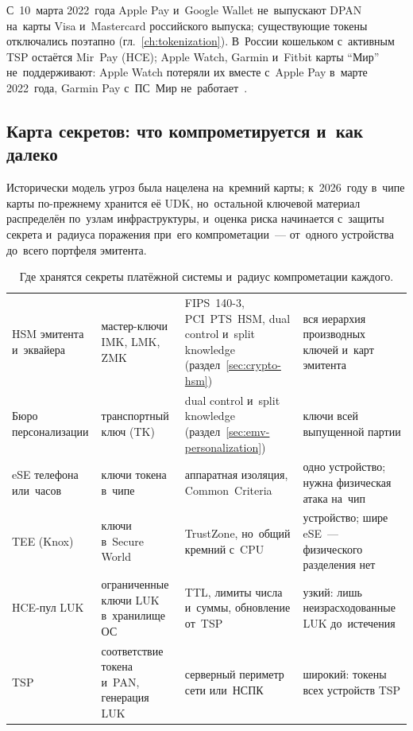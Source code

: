 С~10~марта 2022~года Apple Pay и~Google Wallet не~выпускают DPAN на~карты Visa
и~Mastercard российского выпуска; существующие токены отключались поэтапно
(гл.~\ref{ch:tokenization}). В~России кошельком с~активным TSP остаётся
Mir~Pay (HCE); Apple Watch, Garmin и~Fitbit карты \enquote{Мир}
не~поддерживают: Apple Watch потеряли их вместе с~Apple Pay в~марте
2022~года, Garmin Pay с~ПС~Мир не~работает~\cite{garmin-pay-mir}.

\subsection*{Карта секретов: что компрометируется и~как далеко}\label{sec:contactless-secrets-map}

Исторически модель угроз была нацелена на~кремний карты; к~2026~году в~чипе
карты по-прежнему хранится её UDK, но~остальной ключевой материал распределён
по~узлам инфраструктуры,
и~оценка риска начинается с~защиты секрета и~радиуса поражения при~его
компрометации~--- от~одного устройства до~всего портфеля эмитента.

\begin{table}[H]
  \caption{Где хранятся секреты платёжной системы и~радиус компрометации каждого.}\label{tab:contactless-secrets-map}
  \begingroup
  \tablesetup
  \begin{tabularx}{\textwidth}{@{}P{0.16\textwidth} Y Y Y@{}}
    \toprule
    \headrow
     &  &  &  \\
    \midrule
    HSM эмитента и~эквайера & мастер-ключи IMK, LMK, ZMK & FIPS~140-3, PCI~PTS~HSM, dual control и~split knowledge (раздел~\ref{sec:crypto-hsm}) & вся иерархия производных ключей и~карт эмитента \\
    \rowsep
    Бюро персонализации & транспортный ключ (TK) & dual control и~split knowledge (раздел~\ref{sec:emv-personalization}) & ключи всей выпущенной партии \\
    \rowsep
    eSE телефона или~часов & ключи токена в~чипе & аппаратная изоляция, Common~Criteria & одно устройство; нужна физическая атака на~чип \\
    \rowsep
    TEE (Knox) & ключи в~Secure World & TrustZone, но~общий кремний с~CPU & устройство; шире eSE~--- физического разделения нет \\
    \rowsep
    HCE-пул LUK & ограниченные ключи LUK в~хранилище ОС & TTL, лимиты числа и~суммы, обновление от~TSP & узкий: лишь неизрасходованные LUK до~истечения \\
    \rowsep
    TSP & соответствие токена и~PAN, генерация LUK & серверный периметр сети или~НСПК & широкий: токены всех устройств TSP \\
    \bottomrule
  \end{tabularx}\par
  \endgroup
\end{table}

